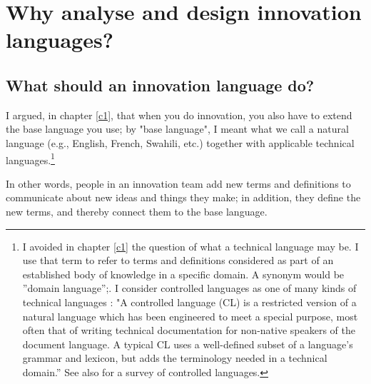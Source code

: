 \chapter{Why analyse and design innovation languages?}
\label{c2}


\section{What should an innovation language do?}
\label{c2:s1}
I argued, in chapter \ref{c1}, that when you do innovation, you also have to extend the base language you use; by "base language", I meant what we call a natural language (e.g., English, French, Swahili, etc.) together with applicable technical languages.\footnote{I avoided in chapter \ref{c1} the question of what a technical language may be. I use that term to refer to terms and definitions considered as part of an established body of knowledge in a specific domain. A synonym would be ''domain language'';. I consider controlled languages as one of many kinds of technical languages \cite{Kittredge2012}: "A controlled language (CL) is a restricted version of a natural language which has been engineered to meet a special purpose, most often that of writing technical documentation for non-native speakers of the document language. A typical CL uses a well-defined subset of a language's grammar and lexicon, but adds the terminology needed in a technical domain.'' See also \cite{Kuhn2014} for a survey of controlled languages.}

In other words, people in an innovation team add new terms and definitions to communicate about new ideas and things they make; in addition, they define the new terms, and thereby connect them to the base language. 

